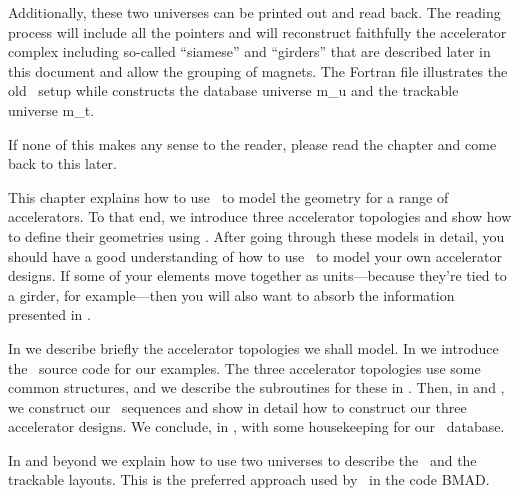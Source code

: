 {{{Additionally, these two universes can be printed out and read back. The reading process will include all the pointers and will reconstruct faithfully the accelerator complex including so-called ``siamese'' and ``girders'' that are described later in this document and allow the grouping of magnets. The Fortran file  illustrates the old \DNA\ setup while  constructs    the database universe m_u and the trackable universe m_t.
 
If none of this makes any sense to the reader, please read the chapter and come back to this later.
}
}}

This chapter explains how to use \PTC\ to model the geometry for a
range of accelerators. To that end, we introduce three accelerator
topologies and show how to define their geometries using \PTC. After
going through these models in detail, you should have a good
understanding of how to use \PTC\ to model your own accelerator
designs. If some of your elements move together as units---because
they're tied to a girder, for example---then you will also want to
absorb the information presented in .

In  we describe briefly the accelerator topologies
we shall model. In  we introduce the \PTC\ source code
for our examples. The three accelerator topologies use some common
structures, and we describe the subroutines for these in
. Then, in  and ,
we construct our \DNA\ sequences and show in detail how to construct
our three accelerator designs. We conclude, in , with
some housekeeping
for our \DNA\ database.

In  and beyond we explain how to use two universes to describe the \DNA\ and the trackable layouts. This is the preferred approach used by  \PTC\ in the code BMAD.




